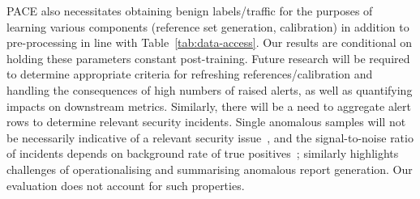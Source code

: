 PACE also necessitates obtaining benign labels/traffic for the purposes of learning various components (reference set generation, calibration) in addition to pre-processing in line with Table~\ref{tab:data-access}. Our results are conditional on holding these parameters constant post-training. Future research will be required to determine appropriate criteria for refreshing references/calibration and handling the consequences of high numbers of raised alerts, as well as quantifying impacts on downstream metrics. Similarly, there will be a need to aggregate alert rows to determine relevant security incidents. Single anomalous samples will not be necessarily indicative of a relevant security issue~\cite{sommer2010closed}, and the signal-to-noise ratio of incidents depends on background rate of true positives~\cite{saito2015precision}; \cite{apruzzese2026sok} similarly highlights challenges of operationalising and summarising anomalous report generation. Our evaluation does not account for such properties.